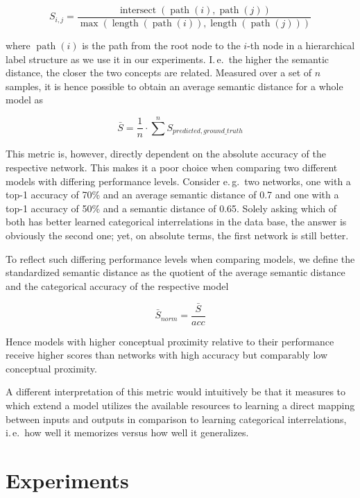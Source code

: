 \documentclass[conference]{IEEEtran}
\begin{document}
\begin{equation*}
    S_{i, j} = \frac{\operatorname{intersect}(\operatorname{path}(i), \operatorname{path}(j))}{\max(\operatorname{length}(\operatorname{path}(i)), \operatorname{length}(\operatorname{path}(j)))}
\end{equation*}

where $\operatorname{path}(i)$ is the path from the root node to the $i$-th node in a hierarchical label structure as we use it in our experiments. I.\,e.\, the higher the semantic distance, the closer the two concepts are related. Measured over a set of $n$ samples, it is hence possible to obtain an average semantic distance for a whole model as

\begin{equation*}
    \bar{S} = \frac{1}{n} \cdot \sum^n{S_{predicted, ground\_truth}}
\end{equation*}

This metric is, however, directly dependent on the absolute accuracy of the respective network. This makes it a poor choice when comparing two different models with differing performance levels. Consider e.\,g.\ two networks, one with a top-1 accuracy of 70\% and an average semantic distance of 0.7 and one with a top-1 accuracy of 50\% and a semantic distance of 0.65. Solely asking which of both has better learned categorical interrelations in the data base, the answer is obviously the second one; yet, on absolute terms, the first network is still better.

To reflect such differing performance levels when comparing models, we define the standardized semantic distance as the quotient of the average semantic distance and the categorical accuracy of the respective model

\begin{equation*}
    \bar{S}_{norm} = \frac{\bar{S}}{acc}
\end{equation*}

Hence models with higher conceptual proximity relative to their performance receive higher scores than networks with high accuracy but comparably low conceptual proximity.

A different interpretation of this metric would intuitively be that it measures to which extend a model utilizes the available resources to learning a direct mapping between inputs and outputs in comparison to learning categorical interrelations, i.\,e.\ how well it memorizes versus how well it generalizes.

\section{Experiments%
         \label{sec:experiments}}
\end{document}

